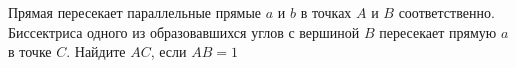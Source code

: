 \begin{ex}
	\begin{condition}
		Прямая пересекает параллельные прямые \( a  \) и \( b  \) в точках \( A  \) и \( B  \) соответственно. Биссектриса одного из образовавшихся углов с вершиной \( B \) пересекает прямую \( a \) в точке \( C \).	Найдите \( AC \), если \( AB = 1 \)
	\end{condition}
\end{ex}